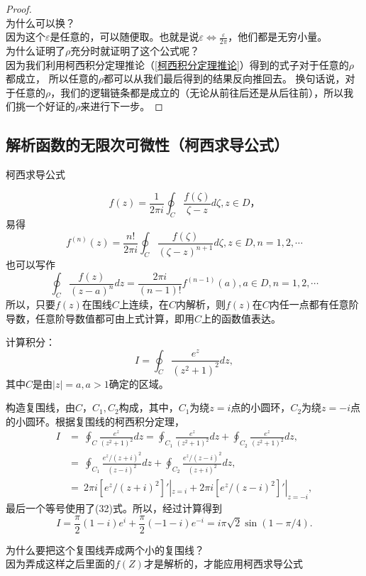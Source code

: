 \documentclass[cn,hazy,blue,14pt,normal]{elegantnote}
\numberwithin{equation}{section}
\begin{document}
\begin{proof}
\\为什么可以换？\\
因为这个$\varepsilon$是任意的，可以随便取。也就是说$\varepsilon \Leftrightarrow \frac{\varepsilon}{2\pi}$，他们都是无穷小量。\\
为什么证明了$\rho$充分时就证明了这个公式呢？\\因为我们利用柯西积分定理推论（\ref{柯西积分定理推论}）得到的式子对于任意的$\rho$都成立，
所以任意的$\rho$都可以从我们最后得到的结果反向推回去。
换句话说，对于任意的$\rho$，我们的逻辑链条都是成立的（无论从前往后还是从后往前），所以我们挑一个好证的$\rho$来进行下一步。
\end{proof}

\subsection{解析函数的无限次可微性（柯西求导公式）}
\begin{definition}
	柯西求导公式
\end{definition}
$$
f(z) = \frac{1}{2\pi i} \oint_C \frac{f(\zeta)}{\zeta - z} d \zeta, z \in D，
$$
易得
\begin{equation}\label{柯西求导公式}
f^{(n)}(z) = \frac{n!}{2\pi i} \oint_C \frac{f(\zeta)}{(\zeta - z)^{n+1}} d\zeta, z \in D, n=1,2,\cdots
\end{equation}
也可以写作
$$
\oint_C \frac{f(z)}{(z-a)^n} dz
= \frac{2\pi i}{(n-1)!} f^{(n-1)} (a), a\in D, n=1,2,\cdots
$$
所以，只要$f(z)$在围线$C$上连续，在$C$内解析，则$f(z)$在$C$内任一点都有任意阶导数，任意阶导数值都可由上式计算，即用$C$上的函数值表达。

\begin{example}
	计算积分：
$$
I = \oint_C \frac{e^z}{(z^2+1)^2} dz,
$$
其中$C$是由$|z|=a,a>1$确定的区域。
\end{example}
构造复围线，由$C，C_1,C_2$构成，其中，$C_1$为绕$z=i$点的小圆环，$C_2$为绕$z=-i$点的小圆环。根据复围线的柯西积分定理，
\begin{align*}
I &=~ \oint_C \frac{e^z}{(z^2+1)^2} dz = \oint_{C_1} \frac{e^z}{(z^2+1)^2} dz + \oint_{C_2} \frac{e^z}{(z^2+1)^2} dz, \nonumber\\
&=~ \oint_{C_1} \frac{e^z/(z+i)^2}{(z-i)^2} dz + \oint_{C_2} \frac{e^z/(z-i)^2}{(z+i)^2} dz, \nonumber\\
&=~ 2 \pi i [e^z/(z+i)^2]'|_{z=i} + 2\pi i[e^z/(z-i)^2]'|_{z=-i},
\end{align*}
最后一个等号使用了(32)式。所以，经过计算得到
$$
I = \frac{\pi}{2}(1-i)e^i + \frac{\pi }{2}(-1-i)e^{-i}
= i\pi \sqrt{2}\sin(1-\pi/4).
$$
\begin{note}
	为什么要把这个复围线弄成两个小的复围线？\\
	因为弄成这样之后里面的$f(Z)$才是解析的，才能应用柯西求导公式
\end{note}
\end{document}
